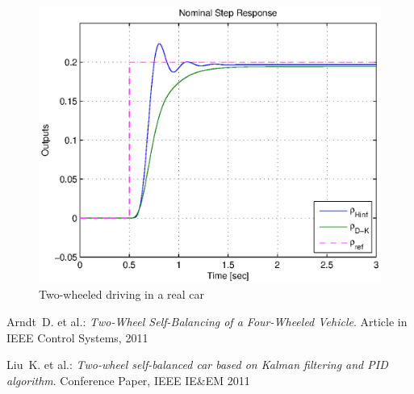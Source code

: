 \documentclass[conference]{IEEEtran}
\begin{document}
\begin{figure}[h]
\centering
  \includegraphics[width=.47\textwidth]{pics/step_comp_02} 
  \caption{Two-wheeled driving in a real car}  
  \label{figure:arab_driving}
\end{figure}



 
 
 
\begin{thebibliography}{1}

 {\sc Arndt~D. et al.}: {\it Two-Wheel Self-Balancing of a Four-Wheeled Vehicle}. Article in IEEE Control Systems, 2011

 {\sc Liu~K. et al.}: {\it Two-wheel self-balanced car based on Kalman filtering and PID algorithm}. Conference Paper, IEEE IE\&EM 2011


\end{thebibliography}


\end{document}
